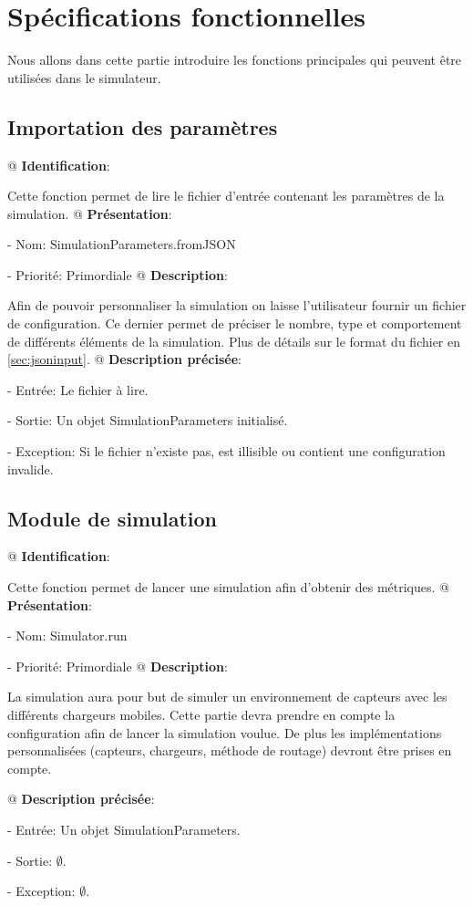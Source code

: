 \documentclass[final]{polytech/polytech}
\begin{document}
\chapter{Spécifications fonctionnelles}
	Nous allons dans cette partie introduire les fonctions principales qui peuvent être utilisées dans le simulateur.
	
	\section{Importation des paramètres}
		\begin{easylist}[enumerate]
			@ \textbf{Identification}:
			
			Cette fonction permet de lire le fichier d'entrée contenant les paramètres de la simulation.
			@ \textbf{Présentation}:
			
			- Nom: SimulationParameters.fromJSON
			
			- Priorité: Primordiale
			@ \textbf{Description}:
			
			Afin de pouvoir personnaliser la simulation on laisse l'utilisateur fournir un fichier de configuration.
			Ce dernier permet de préciser le nombre, type et comportement de différents éléments de la simulation.
			Plus de détails sur le format du fichier en \autoref{sec:jsoninput}.
			@ \textbf{Description précisée}:
			
			- Entrée: Le fichier à lire.
			
			- Sortie: Un objet SimulationParameters initialisé.
			
			- Exception: Si le fichier n'existe pas, est illisible ou contient une configuration invalide.
		\end{easylist}
		
	\section{Module de simulation}
		\begin{easylist}[enumerate]
			@ \textbf{Identification}:
			
			Cette fonction permet de lancer une simulation afin d'obtenir des métriques.
			@ \textbf{Présentation}:
			
			- Nom: Simulator.run
			
			- Priorité: Primordiale
			@ \textbf{Description}:
			
			La simulation aura pour but de simuler un environnement de capteurs avec les différents chargeurs mobiles.
			Cette partie devra prendre en compte la configuration afin de lancer la simulation voulue.
			De plus les implémentations personnalisées (capteurs, chargeurs, méthode de routage) devront être prises en compte.
			
			@ \textbf{Description précisée}:
			
			- Entrée: Un objet SimulationParameters.
			
			- Sortie: $\emptyset$.
			
			- Exception: $\emptyset$.
		\end{easylist}
\end{document}
